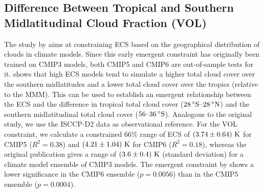 \subsection{Difference Between Tropical and Southern Midlatitudinal Cloud
  Fraction (VOL)}
\label{subsec:05:vol}

The study by \textcite{Volodin2008} aims at constraining \ac{ECS} based on the
geographical distribution of clouds in climate models. Since this early
emergent constraint has originally been trained on \acs{CMIP}3 models, both
\acs{CMIP}5 and \acs{CMIP}6 are out-of-sample tests for it.
\Textcite{Volodin2008} shows that high \ac{ECS} models tend to simulate a
higher total cloud cover over the southern midlatitudes and a lower total cloud
cover over the tropics (relative to the \ac{MMM}). This can be used to
establish an emergent relationship between the \ac{ECS} and the difference in
tropical total cloud cover ($\range{28 \unit{\degree S}}{28 \unit{\degree N}}$)
and the southern midlatitudinal total cloud cover ($\rangeunit{56}{36}{\degree
  S}$). Analogous to the original study, we use the ISCCP-D2 data
\autocite{Rossow1991} as observational reference. For the VOL constraint, we
calculate a constrained $66 \unit{\%}$ range of \ac{ECS} of
$\pmrangeunit{3.74}{0.64}{K}$ for \acs{CMIP}5 ($R^2 = 0.38$) and
$\pmrangeunit{4.21}{1.04}{K}$ for \acs{CMIP}6 ($R^2 = 0.18$), whereas the
original publication gives a range of $\pmrangeunit{3.6}{0.4}{K}$ (standard
deviation) for a climate model ensemble of \acs{CMIP}3 models. The emergent
constraint by \textcite{Volodin2008} shows a lower significance in the
\acs{CMIP}6 ensemble ($p = 0.0056$) than in the \acs{CMIP}5 ensemble ($p =
0.0004$).

